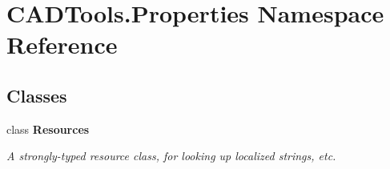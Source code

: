 \hypertarget{namespace_c_a_d_tools_1_1_properties}{}\section{C\+A\+D\+Tools.\+Properties Namespace Reference}
\label{namespace_c_a_d_tools_1_1_properties}
\subsection*{Classes}
\begin{DoxyCompactItemize}
\item 
class {\bfseries Resources}
\begin{DoxyCompactList}\small\item\em A strongly-\/typed resource class, for looking up localized strings, etc. \end{DoxyCompactList}\end{DoxyCompactItemize}
